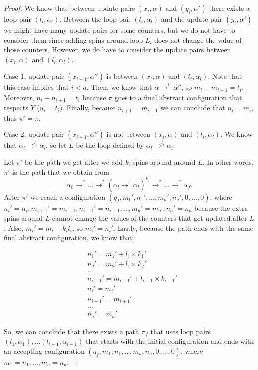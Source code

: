\begin{proof}
We know that between update pairs $(x_i,\alpha)$ and $(y_i,\alpha')$ there exists a loop pair $(l_i,\alpha_l)$. Between the loop pair $(l_i,\alpha_l)$ and the update pair $(y_i,\alpha')$ we might have many update pairs for some counters, but we do not have to consider them since adding spins around loop $L_i$ does not change the value of those counters. However, we do have to consider the update pairs between $(x_i,\alpha)$ and $(l_i,\alpha_l)$. 

Case 1, update pair $(x_{i+1},\alpha'')$ is between $(x_i,\alpha)$ and $(l_i,\alpha_l)$. Note that this case implies that $i<a$. Then, we know that $\alpha\xrightarrow{}^{t_i} \alpha''$, so $m_i-m_{i+1} = t_i$. Moreover, $n_{i}-n_{i+1}=t_i$ because $\pi$ goes to a final abstract configuration that respects $Y$ ($u_i=t_i$). Finally, because $n_{i+1}=m_{i+1}$ we can conclude that $n_{i} = m_i$, thus $\pi'=\pi$. 

Case 2, update pair $(x_{i+1},\alpha'')$ is not between $(x_i,\alpha)$ and $(l_i,\alpha_l)$. We know that $\alpha_l\xrightarrow{}^{l_i}\alpha_l$, so let $L$ be the loop defined by $\alpha_l\xrightarrow{}^{l_i}\alpha_l$.

Let $\pi'$ be the path we get after we add $k_i$ spins around around $L$. In other words, $\pi'$ is the path that we obtain from
$$\alpha_0\xrightarrow{}^*\dots\xrightarrow{}^*(\alpha_l\xrightarrow{}^{l_i}\alpha_l)^{k_i}\xrightarrow{}^*\dots\xrightarrow{}^*\alpha_f.$$
After $\pi'$ we reach a configuration $(q_f,m_1',n_1',\dots,m_a',n_a',0,\dots,0)$, where $n_i'=n_{i},m_{i+1}'=m_{i+1},n_{i+1}'=n_{i+1},\dots,m_{a}'=m_{a'},n_{a}'=n_a$ because the extra spins around $L$ cannot change the values of the counters that get updated after $L$. Also, $m_{i}' = m_{i}+k_il_i$, so $m_i'=n_i'$. Lastly, because the path ends with the same final abstract configuration, we know that:

\begin{align*}
    &n_1' = m_1' + l_1\times k_1'\\
    &n_2' = m_2' + l_2\times k_2'\\
    &\dots\\
    &n_{i-1}' = m_{i-1}' + l_{i-1}\times k_{i-1}'\\
    &n_i' = m_i'\\
    &n_{i+1}' = m_{i+1}'\\
    &\dots\\
    &n_a' = m_a'   
\end{align*}

So, we can conclude that there exists a path $\pi_f$ that uses loop pairs $(l_1,\alpha_1),\dots(l_{i-1},\alpha_{i-1})$ that starts with the initial configuration and ends with an accepting configuration $(q_f,m_1,n_1,\dots,m_a,n_a,0,\dots,0)$, where $m_1=n_1,\dots,m_a=n_a$. 

\end{proof}
